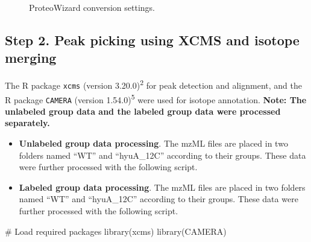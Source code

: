 \documentclass[
  letterpaper,
  DIV=11,
  numbers=noendperiod]{scrreprt}
\newenvironment{Shaded}{\begin{snugshade}}{\end{snugshade}}
\newcommand{\CommentTok}[1]{\textcolor[rgb]{0.37,0.37,0.37}{#1}}
\newcommand{\FunctionTok}[1]{\textcolor[rgb]{0.28,0.35,0.67}{#1}}
\newcommand{\NormalTok}[1]{\textcolor[rgb]{0.00,0.23,0.31}{#1}}
\providecommand{\tightlist}{%
  \setlength{\itemsep}{0pt}\setlength{\parskip}{0pt}}
\begin{document}
\begin{figure}


\caption{\label{fig-figure2-2}ProteoWizard conversion settings.}

\end{figure}%

\subsection{Step 2. Peak picking using XCMS and isotope
merging}\label{step-2.-peak-picking-using-xcms-and-isotope-merging}

The R package \texttt{xcms} (version 3.20.0)\textsuperscript{2} for peak
detection and alignment, and the R package \texttt{CAMERA} (version
1.54.0)\textsuperscript{5} were used for isotope annotation.
\textbf{Note: The unlabeled group data and the labeled group data were
processed separately.}

\begin{itemize}
\tightlist
\item
  \textbf{Unlabeled group data processing}. The mzML files are placed in
  two folders named ``WT'' and ``hyuA\_12C'' according to their groups.
  These data were further processed with the following script.
\item
  \textbf{Labeled group data processing}. The mzML files are placed in
  two folders named ``WT'' and ``hyuA\_12C'' according to their groups.
  These data were further processed with the following script.
\end{itemize}

\begin{Shaded}
\begin{Highlighting}[]
\CommentTok{\# Load required packages}
\FunctionTok{library}\NormalTok{(xcms)}
\FunctionTok{library}\NormalTok{(CAMERA)}
\end{Highlighting}
\end{Shaded}
\end{document}
